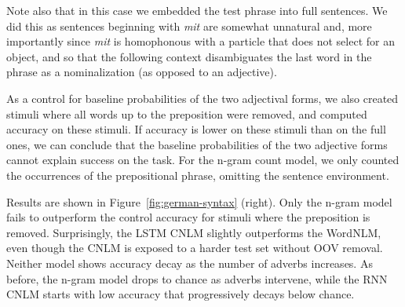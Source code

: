 Note also that in this case we embedded the test phrase into full sentences.
We did this as sentences beginning with \emph{mit} are somewhat unnatural
and, more importantly since \emph{mit} is homophonous with a particle
that does not select for an object, and so that the following context disambiguates
the last word in the phrase as a nominalization (as opposed to an adjective).

As a
control for baseline probabilities of the two adjectival forms, we
also created stimuli where all words up to the preposition were
removed, and computed accuracy on these stimuli.  If accuracy is lower
on these stimuli than on the full ones, we can conclude that the
baseline probabilities of the two adjective forms cannot explain
success on the task. For the n-gram count model, we only counted the
occurrences of the prepositional phrase, omitting the sentence
environment.

%
%
Results are shown in Figure~\ref{fig:german-syntax} (right). Only
the n-gram model fails to outperform the control accuracy for
stimuli where the preposition is removed. Surprisingly, the LSTM CNLM slightly
outperforms the WordNLM, even though the CNLM is exposed
to a harder test set without OOV removal.  Neither model shows
accuracy decay as the number of adverbs increases.  As before, the
n-gram model drops to chance as adverbs intervene, while the RNN CNLM
starts with low accuracy that progressively decays below chance.


